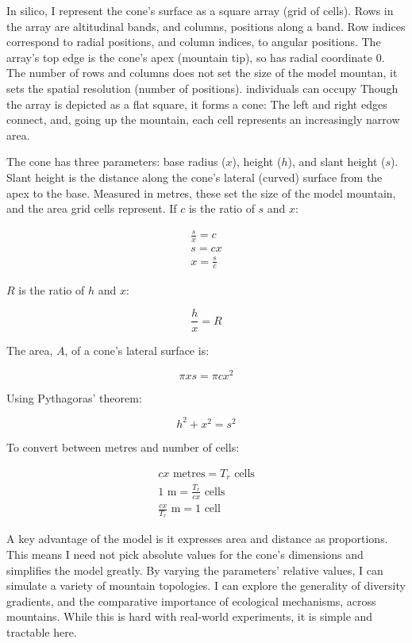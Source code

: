 \documentclass[11pt]{article}
\begin{document}
In silico, I represent the cone's surface as a square array (grid of cells). Rows in the array are altitudinal bands, and columns, positions along a band. Row indices correspond to radial positions, and column indices, to angular positions. The array's top edge is the cone's apex (mountain tip), so has radial coordinate 0.
The number of rows and columns does not set the size of the model mountan, it sets the spatial resolution (number of positions).
individuals can occupy
Though the array is depicted as a flat square, it forms a cone: The left and right edges connect, and, going up the mountain, each cell represents an increasingly narrow area.

The cone has three parameters: base radius ($x$), height ($h$), and slant height ($s$). Slant height is the distance along the cone's lateral (curved) surface from the apex to the base. Measured in metres, these set the size of the model mountain, and the area grid cells represent. If $c$ is the ratio of $s$ and $x$:

\begin{align}
\frac{s}{x} = c \\
s = cx \\
x = \frac{s}{c}
\end{align}

$R$ is the ratio of $h$ and $x$:

\begin{equation}
\frac{h}{x} = R
\end{equation}

The area, $A$, of a cone's lateral surface is:

\begin{equation}
\pi xs = \pi cx^2
\end{equation}

Using Pythagoras' theorem:

\begin{equation}
h^2 + x^2 = s^2
\end{equation}

To convert between metres and number of cells:

\begin{align}
cx \text{ metres} = T_r \text{ cells} \\
1 \text{ m} = \frac{T_r}{cx} \text{ cells} \\
\frac{cx}{T_r} \text{ m} = 1 \text{ cell}
\end{align}

A key advantage of the model is it expresses area and distance as proportions. This means I need not pick absolute values for the cone's dimensions and simplifies the model greatly. By varying the parameters' relative values, I can simulate a variety of mountain topologies. I can explore the generality of diversity gradients, and the comparative importance of ecological mechanisms, across mountains. While this is hard with real-world experiments, it is simple and tractable here.
\end{document}
